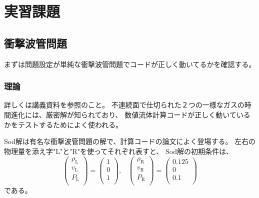 {%
\clearpage
\section{実習課題}

\subsection{衝撃波管問題}
まずは問題設定が単純な衝撃波管問題でコードが正しく動いてるかを確認する。

\subsubsection{理論}

詳しくは講義資料を参照のこと。
不連続面で仕切られた２つの一様なガスの時間進化には、厳密解が知られており、
数値流体計算コードが正しく動いているかをテストするためによく使われる。

Sod解は有名な衝撃波管問題の解で、計算コードの論文によく登場する。
左右の物理量を添え字"L"と"R"を使ってそれぞれ表すと、
Sod解の初期条件は、
\begin{equation}
\left(
\begin{array}{c}
\rho_\mathrm{L} \\
v_\mathrm{L} \\
P_\mathrm{L} \\
\end{array}
\right)
= 
\left(
\begin{array}{c}
1 \\
0 \\
1 \\
\end{array}
\right),\;\;\;
\left(
\begin{array}{c}
\rho_\mathrm{R} \\
v_\mathrm{R} \\
P_\mathrm{R} \\
\end{array}
\right)
= 
\left(
\begin{array}{c}
0.125 \\
0 \\
0.1 \\
\end{array}
\right)
\end{equation}
である。

}
